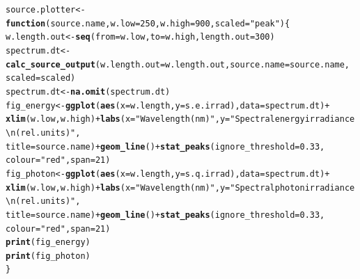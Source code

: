 \documentclass{article}\usepackage[]{graphicx}\usepackage[]{color}
\makeatletter
\newcommand{\hlnum}[1]{\textcolor[rgb]{0.686,0.059,0.569}{#1}}%
\newcommand{\hlstr}[1]{\textcolor[rgb]{0.192,0.494,0.8}{#1}}%
\newcommand{\hlopt}[1]{\textcolor[rgb]{0,0,0}{#1}}%
\newcommand{\hlstd}[1]{\textcolor[rgb]{0.345,0.345,0.345}{#1}}%
\newcommand{\hlkwa}[1]{\textcolor[rgb]{0.161,0.373,0.58}{\textbf{#1}}}%
\newcommand{\hlkwb}[1]{\textcolor[rgb]{0.69,0.353,0.396}{#1}}%
\newcommand{\hlkwc}[1]{\textcolor[rgb]{0.333,0.667,0.333}{#1}}%
\newcommand{\hlkwd}[1]{\textcolor[rgb]{0.737,0.353,0.396}{\textbf{#1}}}%
\newenvironment{kframe}{%
 \def\at@end@of@kframe{}%
 \ifinner\ifhmode%
  \def\at@end@of@kframe{\end{minipage}}%
  \begin{minipage}{\columnwidth}%
 \fi\fi%
 \def\FrameCommand##1{\hskip\@totalleftmargin \hskip-\fboxsep
 \colorbox{shadecolor}{##1}\hskip-\fboxsep
     \hskip-\linewidth \hskip-\@totalleftmargin \hskip\columnwidth}%
 \MakeFramed {\advance\hsize-\width
   \@totalleftmargin\z@ \linewidth\hsize
   \@setminipage}}%
 {\par\unskip\endMakeFramed%
 \at@end@of@kframe}
\newenvironment{knitrout}{}{} %
\makeatother
\begin{document}
\begin{knitrout}\footnotesize
{}\color{fgcolor}\begin{kframe}
\begin{alltt}
\hlstd{source.plotter} \hlkwb{<-} \hlkwa{function}\hlstd{(}\hlkwc{source.name}\hlstd{,} \hlkwc{w.low} \hlstd{=} \hlnum{250}\hlstd{,} \hlkwc{w.high} \hlstd{=} \hlnum{900}\hlstd{,} \hlkwc{scaled} \hlstd{=} \hlstr{"peak"}\hlstd{) \{}
    \hlstd{w.length.out} \hlkwb{<-} \hlkwd{seq}\hlstd{(}\hlkwc{from} \hlstd{= w.low,} \hlkwc{to} \hlstd{= w.high,} \hlkwc{length.out} \hlstd{=} \hlnum{300}\hlstd{)}
    \hlstd{spectrum.dt} \hlkwb{<-} \hlkwd{calc_source_output}\hlstd{(}\hlkwc{w.length.out} \hlstd{= w.length.out,} \hlkwc{source.name} \hlstd{= source.name,}
        \hlkwc{scaled} \hlstd{= scaled)}
    \hlstd{spectrum.dt} \hlkwb{<-} \hlkwd{na.omit}\hlstd{(spectrum.dt)}
    \hlstd{fig_energy} \hlkwb{<-} \hlkwd{ggplot}\hlstd{(}\hlkwd{aes}\hlstd{(}\hlkwc{x} \hlstd{= w.length,} \hlkwc{y} \hlstd{= s.e.irrad),} \hlkwc{data} \hlstd{= spectrum.dt)} \hlopt{+}
        \hlkwd{xlim}\hlstd{(w.low, w.high)} \hlopt{+} \hlkwd{labs}\hlstd{(}\hlkwc{x} \hlstd{=} \hlstr{"Wavelength (nm)"}\hlstd{,} \hlkwc{y} \hlstd{=} \hlstr{"Spectral energy irradiance\textbackslash{}n(rel. units)"}\hlstd{,}
        \hlkwc{title} \hlstd{= source.name)} \hlopt{+} \hlkwd{geom_line}\hlstd{()} \hlopt{+} \hlkwd{stat_peaks}\hlstd{(}\hlkwc{ignore_threshold} \hlstd{=} \hlnum{0.33}\hlstd{,}
        \hlkwc{colour} \hlstd{=} \hlstr{"red"}\hlstd{,} \hlkwc{span} \hlstd{=} \hlnum{21}\hlstd{)}
    \hlstd{fig_photon} \hlkwb{<-} \hlkwd{ggplot}\hlstd{(}\hlkwd{aes}\hlstd{(}\hlkwc{x} \hlstd{= w.length,} \hlkwc{y} \hlstd{= s.q.irrad),} \hlkwc{data} \hlstd{= spectrum.dt)} \hlopt{+}
        \hlkwd{xlim}\hlstd{(w.low, w.high)} \hlopt{+} \hlkwd{labs}\hlstd{(}\hlkwc{x} \hlstd{=} \hlstr{"Wavelength (nm)"}\hlstd{,} \hlkwc{y} \hlstd{=} \hlstr{"Spectral photon irradiance\textbackslash{}n(rel. units)"}\hlstd{,}
        \hlkwc{title} \hlstd{= source.name)} \hlopt{+} \hlkwd{geom_line}\hlstd{()} \hlopt{+} \hlkwd{stat_peaks}\hlstd{(}\hlkwc{ignore_threshold} \hlstd{=} \hlnum{0.33}\hlstd{,}
        \hlkwc{colour} \hlstd{=} \hlstr{"red"}\hlstd{,} \hlkwc{span} \hlstd{=} \hlnum{21}\hlstd{)}
    \hlkwd{print}\hlstd{(fig_energy)}
    \hlkwd{print}\hlstd{(fig_photon)}
\hlstd{\}}
\end{alltt}
\end{kframe}
\end{knitrout}


\newpage
\end{document}
